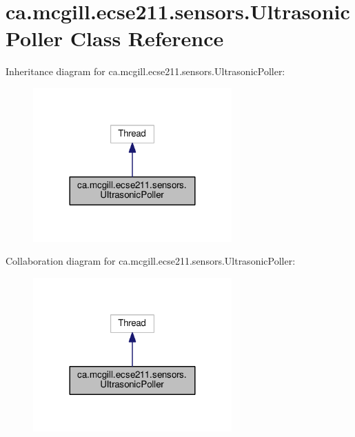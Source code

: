 \hypertarget{classca_1_1mcgill_1_1ecse211_1_1sensors_1_1_ultrasonic_poller}{}\section{ca.\+mcgill.\+ecse211.\+sensors.\+Ultrasonic\+Poller Class Reference}
\label{classca_1_1mcgill_1_1ecse211_1_1sensors_1_1_ultrasonic_poller}


Inheritance diagram for ca.\+mcgill.\+ecse211.\+sensors.\+Ultrasonic\+Poller\+:\nopagebreak
\begin{figure}[H]
\begin{center}
\leavevmode
\includegraphics[width=216pt]{classca_1_1mcgill_1_1ecse211_1_1sensors_1_1_ultrasonic_poller__inherit__graph}
\end{center}
\end{figure}


Collaboration diagram for ca.\+mcgill.\+ecse211.\+sensors.\+Ultrasonic\+Poller\+:\nopagebreak
\begin{figure}[H]
\begin{center}
\leavevmode
\includegraphics[width=216pt]{classca_1_1mcgill_1_1ecse211_1_1sensors_1_1_ultrasonic_poller__coll__graph}
\end{center}
\end{figure}
